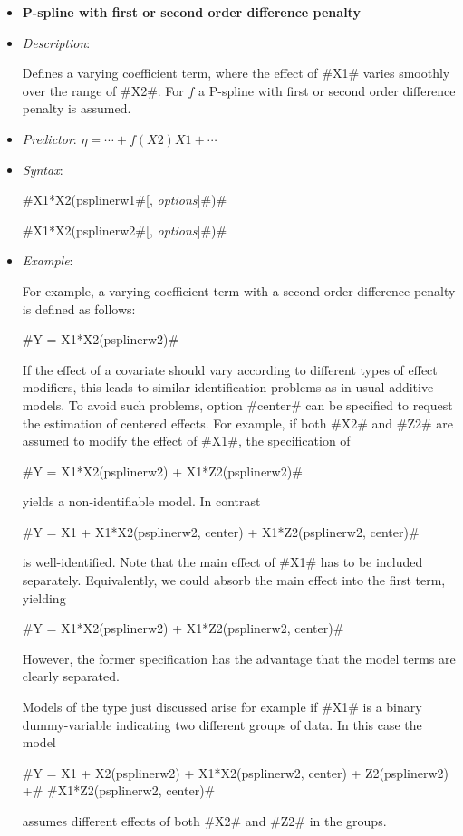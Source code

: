\begin{itemize}
\item[]{\bf\sffamily P-spline with first or second order difference penalty}

\item[] {\em Description}:

Defines a varying coefficient term, where the effect of #X1#
varies smoothly over the range of #X2#.  For
$f$ a P-spline with first or second order difference  penalty is assumed.
\item[] {\em Predictor}: $\eta= \cdots + f(X2)X1 + \cdots$
\item[] {\em Syntax}:

#X1*X2(psplinerw1#[, {\em options}]#)#

#X1*X2(psplinerw2#[, {\em options}]#)#
\item[] {\em Example}:

For example, a varying coefficient term with a second order difference penalty
is defined as follows:

#Y = X1*X2(psplinerw2)#

If the effect of a covariate should vary according to different
types of effect modifiers, this leads to similar identification
problems as in usual additive models. To avoid such problems,
option #center# can be specified to request the estimation of
centered effects. For example, if both #X2# and #Z2# are assumed
to modify the effect of #X1#, the specification of

#Y = X1*X2(psplinerw2) + X1*Z2(psplinerw2)#

yields a non-identifiable model. In contrast

#Y = X1 + X1*X2(psplinerw2, center) + X1*Z2(psplinerw2, center)#

is well-identified. Note that the main effect of #X1# has to be
included separately. Equivalently, we could absorb the main effect
into the first term, yielding

#Y = X1*X2(psplinerw2) + X1*Z2(psplinerw2, center)#

However, the former specification has the advantage that the model
terms are clearly separated.

Models of the type just discussed arise for example if #X1# is a
binary dummy-variable indicating two different groups of data. In
this case the model

 #Y = X1 + X2(psplinerw2) + X1*X2(psplinerw2, center) + Z2(psplinerw2) +#
 #X1*Z2(psplinerw2, center)#

assumes different effects of both #X2# and #Z2# in the groups.


\end{itemize}
